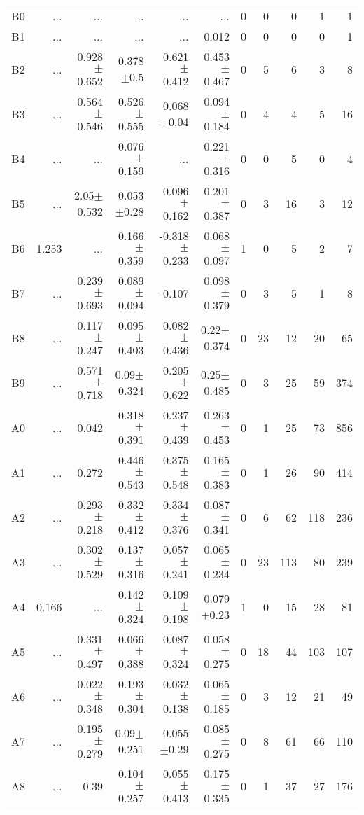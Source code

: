 \begin{table}[t]
\begin{table}[t]
\begin{center}
\begin{tabular}{c|rrrrr|rrrrr}
    B0	&	 ...	&	 ...	&	 ...	&	 ...	&	 ...	&	0	&	0	&	0	&	1	&	1	\\
    B1	&	 ...	&	 ...	&	 ...	&	 ...	&	0.012	&	0	&	0	&	0	&	0	&	1	\\
    B2	&	 ...	&	0.928$\pm$0.652	&	0.378$\pm$0.5	&	0.621$\pm$0.412	&	0.453$\pm$0.467	&	0	&	5	&	6	&	3	&	8	\\
    B3	&	 ...	&	0.564$\pm$0.546	&	0.526$\pm$0.555	&	0.068$\pm$0.04	&	0.094$\pm$0.184	&	0	&	4	&	4	&	5	&	16	\\
    B4	&	 ...	&	 ...	&	0.076$\pm$0.159	&	 ...	&	0.221$\pm$0.316	&	0	&	0	&	5	&	0	&	4	\\
    B5	&	 ...	&	2.05$\pm$0.532	&	0.053$\pm$0.28	&	0.096$\pm$0.162	&	0.201$\pm$0.387	&	0	&	3	&	16	&	3	&	12	\\
    B6	&	1.253	&	 ...	&	0.166$\pm$0.359	&	-0.318$\pm$0.233	&	0.068$\pm$0.097	&	1	&	0	&	5	&	2	&	7	\\
    B7	&	 ...	&	0.239$\pm$0.693	&	0.089$\pm$0.094	&	-0.107	&	0.098$\pm$0.379	&	0	&	3	&	5	&	1	&	8	\\
    B8	&	 ...	&	0.117$\pm$0.247	&	0.095$\pm$0.403	&	0.082$\pm$0.436	&	0.22$\pm$0.374	&	0	&	23	&	12	&	20	&	65	\\
    B9	&	 ...	&	0.571$\pm$0.718	&	0.09$\pm$0.324	&	0.205$\pm$0.622	&	0.25$\pm$0.485	&	0	&	3	&	25	&	59	&	374	\\
    A0	&	 ...	&	0.042	&	0.318$\pm$0.391	&	0.237$\pm$0.439	&	0.263$\pm$0.453	&	0	&	1	&	25	&	73	&	856	\\
    A1	&	 ...	&	0.272	&	0.446$\pm$0.543	&	0.375$\pm$0.548	&	0.165$\pm$0.383	&	0	&	1	&	26	&	90	&	414	\\
    A2	&	 ...	&	0.293$\pm$0.218	&	0.332$\pm$0.412	&	0.334$\pm$0.376	&	0.087$\pm$0.341	&	0	&	6	&	62	&	118	&	236	\\
    A3	&	 ...	&	0.302$\pm$0.529	&	0.137$\pm$0.316	&	0.057$\pm$0.241	&	0.065$\pm$0.234	&	0	&	23	&	113	&	80	&	239	\\
    A4	&	0.166	&	 ...	&	0.142$\pm$0.324	&	0.109$\pm$0.198	&	0.079$\pm$0.23	&	1	&	0	&	15	&	28	&	81	\\
    A5	&	 ...	&	0.331$\pm$0.497	&	0.066$\pm$0.388	&	0.087$\pm$0.324	&	0.058$\pm$0.275	&	0	&	18	&	44	&	103	&	107	\\
    A6	&	 ...	&	0.022$\pm$0.348	&	0.193$\pm$0.304	&	0.032$\pm$0.138	&	0.065$\pm$0.185	&	0	&	3	&	12	&	21	&	49	\\
    A7	&	 ...	&	0.195$\pm$0.279	&	0.09$\pm$0.251	&	0.055$\pm$0.29	&	0.085$\pm$0.275	&	0	&	8	&	61	&	66	&	110	\\
    A8	&	 ...	&	0.39	&	0.104$\pm$0.257	&	0.055$\pm$0.413	&	0.175$\pm$0.335	&	0	&	1	&	37	&	27	&	176	\\

\end{tabular}
\end{center}
\end{table}
\end{table}
